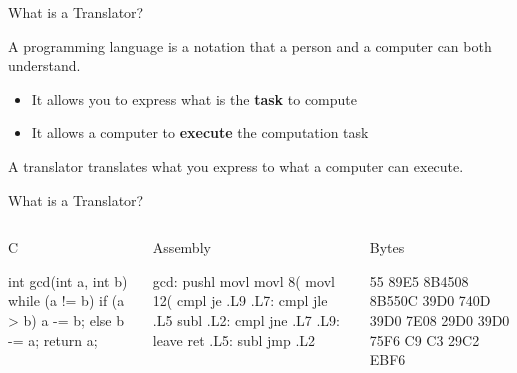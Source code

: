 \documentclass{plt}
\begin{document}
\begin{frame}[fragile]{What is a Translator?}

A programming language is a notation that  a person and a computer can both understand.
\begin{itemize}

\item It allows you to express what is the \textbf{task} to compute

\item It allows a computer to \textbf{execute} the computation task

\end{itemize}


\alert{A translator translates what you express to what a computer can execute.}

\end{frame}

\begin{frame}[fragile]{What is a Translator?}


  \begin{columns}

    \begin{column}[t]{0.35\textwidth}

      \alert{C}

      \medskip  
  \begin{C}
int gcd(int a, int b)
{
  while (a != b) {
    if (a > b) 
        a -= b;
    else b -= a;
  }
  return a;
}
\end{C}
    \end{column}

    \begin{column}[t]{0.36\textwidth}

      \alert{Assembly}

      \medskip

\begin{shadedverbatim}
gcd: pushl %
     movl  %
     movl  8(%
     movl  12(%
     cmpl  %
     je    .L9
.L7: cmpl  %
     jle   .L5
     subl  %
.L2: cmpl  %
     jne   .L7
.L9: leave
     ret
.L5: subl  %
     jmp   .L2
\end{shadedverbatim}

    \end{column}

    \begin{column}[t]{0.13\textwidth}

      \alert{Bytes}

      \medskip

\begin{shadedverbatim}
55    
89E5  
8B4508
8B550C
39D0  
740D
39D0  
7E08  
29D0  
39D0  
75F6  
C9    
C3    
29C2  
EBF6
\end{shadedverbatim}   
    
    \end{column}
    
  \end{columns}

\end{frame}
\end{document}
